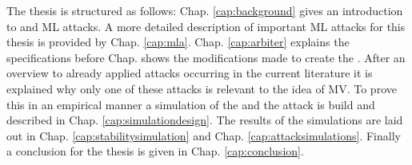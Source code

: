 The thesis is structured as follows: 
Chap. \ref{cap:background} gives an introduction to \pufs and \ac{ML} attacks.
A more detailed description of important \ac{ML} attacks for this thesis is provided by Chap. \ref{cap:mla}.
Chap. \ref{cap:arbiter} explains the \apuf specifications before Chap. shows the modifications made to create the \mpuf.
After an overview to already applied attacks occurring in the current literature it is explained why only one of these attacks is relevant to the idea of \ac{MV}.
To prove this in an empirical manner a simulation of the \apuf and the attack is build and described in Chap. \ref{cap:simulationdesign}.
The results of the simulations are laid out in Chap. \ref{cap:stabilitysimulation} and Chap. \ref{cap:attacksimulations}.
Finally a conclusion for the thesis is given in Chap. \ref{cap:conclusion}.

